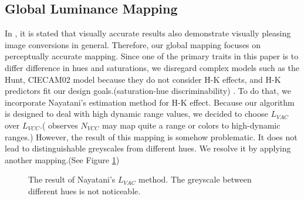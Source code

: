\documentclass{article}
\begin{document}
\subsection{Global Luminance Mapping}
In \cite{cadik08perceptual}, it is stated that visually accurate results also demonstrate visually pleasing image conversions in general. Therefore, our global mapping focuses on perceptually accurate mapping. Since one of the primary traits in this paper is to differ difference in hues and saturations, we disregard complex models such as the Hunt, CIECAM02 model because they do not consider H-K effects, and H-K predictors fit our design goals.(saturation-hue discriminability) . To do that, we incorporate Nayatani's estimation method for H-K effect. \cite{Nayatani98} Because our algorithm is designed to deal with high dynamic range values, we decided to choose $L_{VAC}$ over $L_{VCC}$.(\cite{Smith_apparentgreyscale} observes $N_{VCC}$ may map quite a range or colors to high-dynamic ranges.) However, the result of this mapping is somehow problematic. It does not lead to distinguishable greyscales from different hues. We resolve it by applying another mapping.(See Figure \ref{fig:nayatani})

\begin{figure}[h]
  \begin{center}
  \end{center}
  \caption{The result of Nayatani's $L_{VAC}$ method. The greyscale between different hues is not noticeable.}
  \label{fig:nayatani}
\end{figure}
\end{document}

